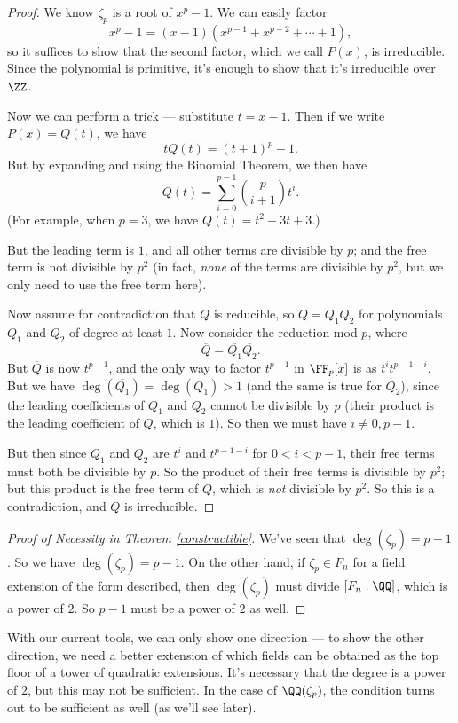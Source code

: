 \begin{proof}
    We know $\zeta_p$ is a root of $x^p - 1$. We can easily factor \[x^p - 1 = (x - 1)(x^{p - 1} + x^{p - 2} + \cdots + 1),\] so it suffices to show that the second factor, which we call $P(x)$, is irreducible. Since the polynomial is primitive, it's enough to show that it's irreducible over $\ZZ$. 
    
    Now we can perform a trick --- substitute $t = x - 1$. Then if we write $P(x) = Q(t)$, we have \[tQ(t) = (t + 1)^p - 1.\] But by expanding and using the Binomial Theorem, we then have \[Q(t) = \sum_{i = 0}^{p - 1} \binom{p}{i + 1}t^i.\] (For example, when $p = 3$, we have $Q(t) = t^2 + 3t + 3$.)
    
    But the leading term is $1$, and all other terms are divisible by $p$; and the free term is not divisible by $p^2$ (in fact, \emph{none} of the terms are divisible by $p^2$, but we only need to use the free term here). 
    
    Now assume for contradiction that $Q$ is reducible, so $Q = Q_1Q_2$ for polynomials $Q_1$ and $Q_2$ of degree at least $1$. Now consider the reduction mod $p$, where \[\overline{Q} = \overline{Q_1}\overline{Q_2}.\] But $\overline{Q}$ is now $t^{p - 1}$, and the only way to factor $t^{p - 1}$ in $\FF_p[x]$ is as $t^it^{p - 1 - i}$. But we have $\deg(\overline{Q_1}) = \deg(Q_1) > 1$ (and the same is true for $Q_2$), since the leading coefficients of $Q_1$ and $Q_2$ cannot be divisible by $p$ (their product is the leading coefficient of $Q$, which is $1$). So then we must have $i \neq 0, p - 1$. 
    
    But then since $Q_1$ and $Q_2$ are $t^i$ and $t^{p - 1 - i}$ for $0 < i < p - 1$, their free terms must both be divisible by $p$. So the product of their free terms is divisible by $p^2$; but this product is the free term of $Q$, which is \emph{not} divisible by $p^2$. So this is a contradiction, and $Q$ is irreducible. 
\end{proof}

\begin{proof}[Proof of Necessity in Theorem \ref{constructible}]
    We've seen that $\deg(\zeta_p) = p - 1$. So we have $\deg(\zeta_p) = p - 1$. On the other hand, if $\zeta_p \in F_n$ for a field extension of the form described, then $\deg(\zeta_p)$ must divide $[F_n : \QQ]$, which is a power of $2$. So $p - 1$ must be a power of $2$ as well. 
\end{proof}

With our current tools, we can only show one direction --- to show the other direction, we need a better extension of which fields can be obtained as the top floor of a tower of quadratic extensions. It's necessary that the degree is a power of $2$, but this may not be sufficient. In the case of $\QQ(\zeta_p)$, the condition turns out to be sufficient as well (as we'll see later). 

